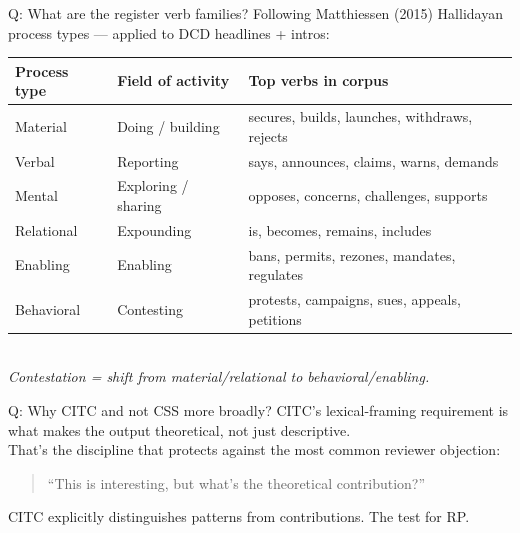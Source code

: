 \documentclass[aspectratio=169,11pt]{beamer}
\begin{document}
\begin{frame}[noframenumbering]{\enspace Q: What are the register verb families?}
\footnotesize
Following Matthiessen (2015) Hallidayan process types — applied to DCD headlines + intros:\\[0.4em]
\begin{tabular}{@{}lll@{}}
\toprule
\textbf{Process type} & \textbf{Field of activity} & \textbf{Top verbs in corpus} \\
\midrule
Material    & Doing / building      & secures, builds, launches, withdraws, rejects \\
Verbal      & Reporting             & says, announces, claims, warns, demands \\
Mental      & Exploring / sharing   & opposes, concerns, challenges, supports \\
Relational  & Expounding            & is, becomes, remains, includes \\
Enabling    & Enabling              & bans, permits, rezones, mandates, regulates \\
Behavioral  & Contesting            & protests, campaigns, sues, appeals, petitions \\
\bottomrule
\end{tabular}\\[0.3em]
\textcolor{dcgray}{\textit{Contestation = shift from material/relational to behavioral/enabling.}}
\end{frame}

\begin{frame}[noframenumbering]{\enspace Q: Why CITC and not CSS more broadly?}
\footnotesize
CITC's lexical-framing requirement is what makes the output theoretical, not just descriptive.\\[0.5em]
That's the discipline that protects against the most common reviewer objection:\\[0.3em]
\begin{quote}
  ``This is interesting, but what's the theoretical contribution?''
\end{quote}
\vspace{0.3em}
CITC explicitly distinguishes patterns from contributions. The test for RP.
\end{frame}
\end{document}
